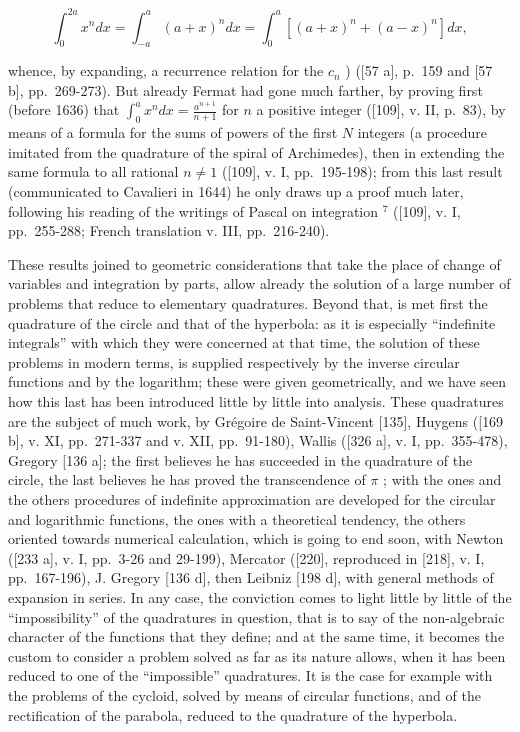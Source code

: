 \[
\int_ {0} ^ {2 a} x ^ {n} d x = \int_ {- a} ^ {a} (a + x) ^ {n} d x = \int_ {0} ^ {a} [ (a + x) ^ {n} + (a - x) ^ {n} ] d x,
\]

whence, by expanding, a recurrence relation for the \(c_n\) ) ({[}57 a{]}, p.~159 and {[}57 b{]}, pp.~269-273). But already Fermat had gone much farther, by proving first (before 1636) that \(\int_0^a x^n dx = \frac{a^{n+1}}{n+1}\) for \(n\) a positive integer ({[}109{]}, v. II, p.~83), by means of a formula for the sums of powers of the first \(N\) integers (a procedure imitated from the quadrature of the spiral of Archimedes), then in extending the same formula to all rational \(n \neq 1\) ({[}109{]}, v. I, pp.~195-198); from this last result (communicated to Cavalieri in 1644) he only draws up a proof much later, following his reading of the writings of Pascal on integration \(^7\) ({[}109{]}, v. I, pp.~255-288; French translation v. III, pp.~216-240).

These results joined to geometric considerations that take the place of change of variables and integration by parts, allow already the solution of a large number of problems that reduce to elementary quadratures. Beyond that, is met first the quadrature of the circle and that of the hyperbola: as it is especially ``indefinite integrals'' with which they were concerned at that time, the solution of these problems in modern terms, is supplied respectively by the inverse circular functions and by the logarithm; these were given geometrically, and we have seen how this last has been introduced little by little into analysis. These quadratures are the subject of much work, by Grégoire de Saint-Vincent {[}135{]}, Huygens ({[}169 b{]}, v. XI, pp.~271-337 and v. XII, pp.~91-180), Wallis ({[}326 a{]}, v. I, pp.~355-478), Gregory {[}136 a{]}; the first believes he has succeeded in the quadrature of the circle, the last believes he has proved the transcendence of \(\pi\) ; with the ones and the others procedures of indefinite approximation are developed for the circular and logarithmic functions, the ones with a theoretical tendency, the others oriented towards numerical calculation, which is going to end soon, with Newton ({[}233 a{]}, v. I, pp.~3-26 and 29-199), Mercator ({[}220{]}, reproduced in {[}218{]}, v. I, pp.~167-196), J. Gregory {[}136 d{]}, then Leibniz {[}198 d{]}, with general methods of expansion in series. In any case, the conviction comes to light little by little of the ``impossibility'' of the quadratures in question, that is to say of the non-algebraic character of the functions that they define; and at the same time, it becomes the custom to consider a problem solved as far as its nature allows, when it has been reduced to one of the ``impossible'' quadratures. It is the case for example with the problems of the cycloid, solved by means of circular functions, and of the rectification of the parabola, reduced to the quadrature of the hyperbola.

